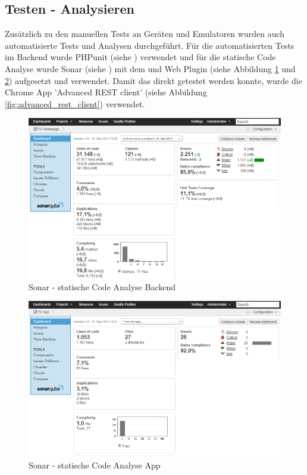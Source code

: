 \newpage
\subsection{Testen - Analysieren}
Zusätzlich zu den manuellen Tests an Geräten und  Emulatoren wurden auch automatisierte Tests und Analysen durchgeführt. Für die automatisierten Tests im Backend wurde PHPunit (siehe \cite{phpunit}) verwendet und für die statische Code Analyse wurde Sonar (siehe \cite{sonar}) mit dem  und Web Plugin (siehe Abbildung \ref{fig:sonar_backend} und \ref{fig:sonar_app}) aufgesetzt und verwendet. Damit das  direkt getestet werden konnte, wurde die Chrome App 'Advanced REST client' (siehe Abbildung \ref{fig:advanced_rest_client}) verwendet.

\begin{figure}[h]
\centering
\includegraphics[scale=0.5]{images/sonar_backend.png}
\caption{Sonar - statische Code Analyse Backend}
\label{fig:sonar_backend}
\end{figure}

\begin{figure}[h]
\centering
\includegraphics[scale=0.5]{images/sonar_app.png}
\caption{Sonar - statische Code Analyse App}
\label{fig:sonar_app}
\end{figure}

